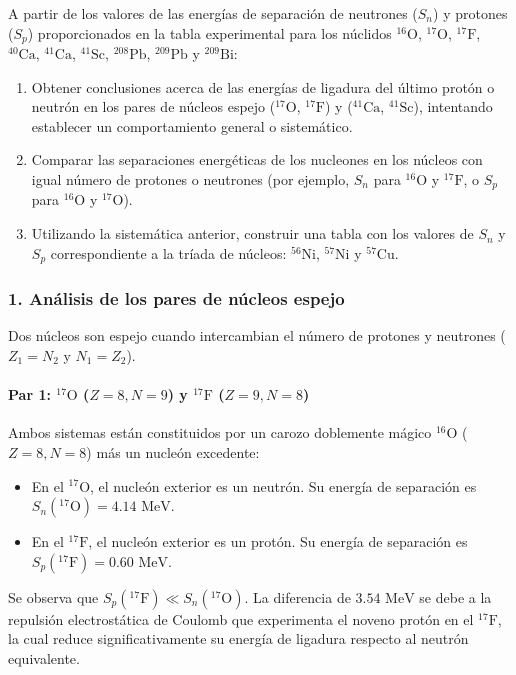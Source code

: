 \begin{problema}
A partir de los valores de las energías de separación de neutrones ($S_n$) y protones ($S_p$) proporcionados en la tabla experimental para los núclidos ${}^{16}\text{O}$, ${}^{17}\text{O}$, ${}^{17}\text{F}$, ${}^{40}\text{Ca}$, ${}^{41}\text{Ca}$, ${}^{41}\text{Sc}$, ${}^{208}\text{Pb}$, ${}^{209}\text{Pb}$ y ${}^{209}\text{Bi}$:

\begin{enumerate}[label=\alph*)]
    \item Obtener conclusiones acerca de las energías de ligadura del último protón o neutrón en los pares de núcleos espejo (${}^{17}\text{O}$, ${}^{17}\text{F}$) y (${}^{41}\text{Ca}$, ${}^{41}\text{Sc}$), intentando establecer un comportamiento general o sistemático.
    \item Comparar las separaciones energéticas de los nucleones en los núcleos con igual número de protones o neutrones (por ejemplo, $S_n$ para ${}^{16}\text{O}$ y ${}^{17}\text{F}$, o $S_p$ para ${}^{16}\text{O}$ y ${}^{17}\text{O}$).
    \item Utilizando la sistemática anterior, construir una tabla con los valores de $S_n$ y $S_p$ correspondiente a la tríada de núcleos: ${}^{56}\text{Ni}$, ${}^{57}\text{Ni}$ y ${}^{57}\text{Cu}$.
\end{enumerate}

\tcblower

\subsubsection*{1. Análisis de los pares de núcleos espejo}

Dos núcleos son espejo cuando intercambian el número de protones y neutrones ($Z_1 = N_2$ y $N_1 = Z_2$).

\paragraph{Par 1: ${}^{17}\text{O}$ ($Z=8, N=9$) y ${}^{17}\text{F}$ ($Z=9, N=8$)}
Ambos sistemas están constituidos por un carozo doblemente mágico ${}^{16}\text{O}$ ($Z=8, N=8$) más un nucleón excedente:
\begin{itemize}
    \item En el ${}^{17}\text{O}$, el nucleón exterior es un neutrón. Su energía de separación es $S_n({}^{17}\text{O}) = 4.14\text{ MeV}$.
    \item En el ${}^{17}\text{F}$, el nucleón exterior es un protón. Su energía de separación es $S_p({}^{17}\text{F}) = 0.60\text{ MeV}$.
\end{itemize}
Se observa que $S_p({}^{17}\text{F}) \ll S_n({}^{17}\text{O})$. La diferencia de $3.54\text{ MeV}$ se debe a la repulsión electrostática de Coulomb que experimenta el noveno protón en el ${}^{17}\text{F}$, la cual reduce significativamente su energía de ligadura respecto al neutrón equivalente.


\end{problema}

